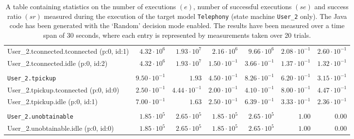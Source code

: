 \begin{table}[htbp]
{\begin{tabular}{lrrrrrr}
\hspace{3mm}User\_2.tconnected.tconnected (p:0, id:1) &  $4.32 \cdot 10^{6}$ &  $1.93 \cdot 10^{7}$ &  $2.16 \cdot 10^{6}$ &  $9.66 \cdot 10^{6}$ & $2.08 \cdot 10^{-1}$ & $2.60 \cdot 10^{-1}$ \\
\hspace{3mm}User\_2.tconnected.idle (p:0, id:2)       &  $4.32 \cdot 10^{6}$ &  $1.93 \cdot 10^{7}$ & $1.50 \cdot 10^{-1}$ & $3.66 \cdot 10^{-1}$ & $1.37 \cdot 10^{-1}$ & $1.32 \cdot 10^{-1}$ \\
\\[-8pt]\texttt{User\_2.tpickup}                      & $9.50 \cdot 10^{-1}$ &               $1.93$ & $4.50 \cdot 10^{-1}$ & $8.26 \cdot 10^{-1}$ & $6.20 \cdot 10^{-1}$ & $3.15 \cdot 10^{-1}$ \\
\hspace{3mm}User\_2.tpickup.tconnected (p:0, id:0)    & $2.50 \cdot 10^{-1}$ & $4.44 \cdot 10^{-1}$ & $2.00 \cdot 10^{-1}$ & $4.10 \cdot 10^{-1}$ & $8.00 \cdot 10^{-1}$ & $4.47 \cdot 10^{-1}$ \\
\hspace{3mm}User\_2.tpickup.idle (p:0, id:1)          & $7.00 \cdot 10^{-1}$ &               $1.63$ & $2.50 \cdot 10^{-1}$ & $6.39 \cdot 10^{-1}$ & $3.33 \cdot 10^{-1}$ & $2.36 \cdot 10^{-1}$ \\
\\[-8pt]\texttt{User\_2.unobtainable}                 &  $1.85 \cdot 10^{5}$ &  $2.65 \cdot 10^{5}$ &  $1.85 \cdot 10^{5}$ &  $2.65 \cdot 10^{5}$ &               $1.00$ &               $0.00$ \\
\hspace{3mm}User\_2.unobtainable.idle (p:0, id:0)     &  $1.85 \cdot 10^{5}$ &  $2.65 \cdot 10^{5}$ &  $1.85 \cdot 10^{5}$ &  $2.65 \cdot 10^{5}$ &               $1.00$ &               $0.00$ \\
\bottomrule
\end{tabular}
}
\caption{A table containing statistics on the number of executions $(e)$, number of successful executions $(se)$ and success ratio $(sr)$ measured during the execution of the target model \texttt{Telephony} (state machine \texttt{User\_2} only). The Java code has been generated with the `Random' decision mode enabled. The results have been measured over a time span of 30 seconds, where each entry is represented by measurements taken over 20 trials.}
\label{table:frequency_results_telephony_random_user_2}
\end{table}